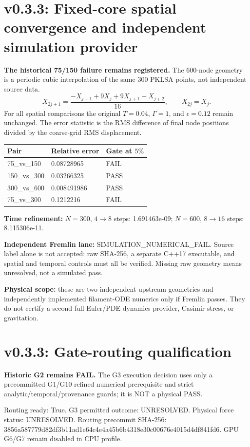 \documentclass[10pt,a4paper]{article}
\begin{document}
\section{v0.3.3: Fixed-core spatial convergence and independent simulation provider}
\textbf{The historical 75/150 failure remains registered.}
The $600$-node geometry is a periodic cubic interpolation of the same $300$ PKLSA points, not independent source data.
\[
  X_{2j+1}=\frac{-X_{j-1}+9X_j+9X_{j+1}-X_{j+2}}{16},\qquad X_{2j}=X_j.
\]
For all spatial comparisons the original $T=0.04$, $\Gamma=1$, and $\epsilon=0.12$ remain unchanged. The error statistic is the RMS difference of final node positions divided by the coarse-grid RMS displacement.
\begin{center}\begin{tabular}{lll}\toprule
Pair & Relative error & Gate at $5\%$ \\\midrule
75\_vs\_150 & 0.08728965 & FAIL \\
150\_vs\_300 & 0.03266325 & PASS \\
300\_vs\_600 & 0.008491986 & PASS \\
75\_vs\_300 & 0.1212216 & FAIL \\
\bottomrule\end{tabular}\end{center}
\textbf{Time refinement:} $N=300$, $4\to8$ steps: 1.691463e-09; $N=600$, $8\to16$ steps: 8.115306e-11.\par
\textbf{Independent Fremlin lane:} SIMULATION\_NUMERICAL\_FAIL. Source label alone is not accepted: raw SHA-256, a separate C++17 executable, and spatial and temporal controls must all be verified. Missing raw geometry means unresolved, not a simulated pass.\par
\textbf{Physical scope:} these are two independent upstream geometries and independently implemented filament-ODE numerics only if Fremlin passes. They do not certify a second full Euler/PDE dynamics provider, Casimir stress, or gravitation.
\section{v0.3.3: Gate-routing qualification}\textbf{Historic G2 remains FAIL.} The G3 execution decision uses only a precommitted G1/G10 refined numerical prerequisite and strict analytic/temporal/provenance guards; it is NOT a physical PASS. \par Routing ready: True. G3 permitted outcome: UNRESOLVED. Physical force status: UNRESOLVED. Routing precommit SHA-256: 3856a587779d82df3b11ad1e64c4e4a45b6b4318e30c00676e4015d4df841fd6. GPU G6/G7 remain disabled in CPU profile.
\end{document}
